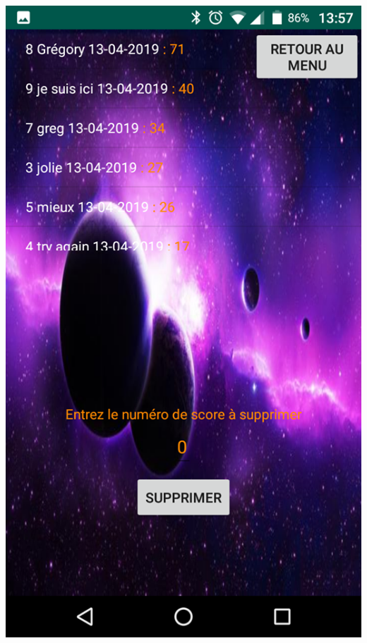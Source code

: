 \documentclass{article}
\begin{document}
\begin{minipage}[c]{.46\linewidth}
     \begin{center}
             \includegraphics[scale=0.2]{AllScore.png}
         \end{center}
   \end{minipage} \hfill
\end{document}
